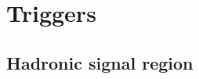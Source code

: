 \clearpage
\section{Triggers\label{sec:triggers}} 

\subsection{Hadronic signal region\label{sec:signal_triggers}} 

%
%
%
%
